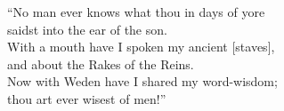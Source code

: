 \bvb{}
“No man ever knows what thou in days of yore \\
saidst into the ear of the son. \\
With a  mouth have I spoken my ancient [staves], \\
and about the Rakes of the Reins. \\
Now with Weden have I shared my word-wisdom; \\
thou art ever wisest of men!”\evb\evg

\sectionline
